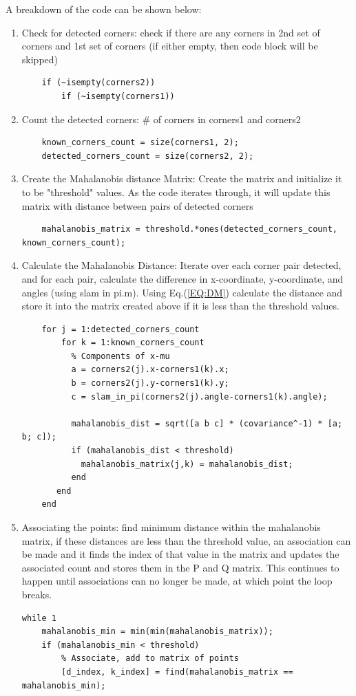 A breakdown of the code can be shown below:
\begin{enumerate}
    \item Check for detected corners: check if there are any corners in 2nd set of corners and 1st set of corners (if either empty, then code block will be skipped)
    \begin{lstlisting}
    if (~isempty(corners2))
        if (~isempty(corners1))
    \end{lstlisting}
    \item Count the detected corners: \# of corners in corners1 and corners2
    \begin{lstlisting}
    known_corners_count = size(corners1, 2);
    detected_corners_count = size(corners2, 2);
    \end{lstlisting}
    \item Create the Mahalanobis distance Matrix: Create the matrix and initialize it to be "threshold" values. As the code iterates through, it will update this matrix with distance between pairs of detected corners
    \begin{lstlisting}
    mahalanobis_matrix = threshold.*ones(detected_corners_count, known_corners_count);
    \end{lstlisting}
    \item Calculate the Mahalanobis Distance: Iterate over each corner pair detected, and for each pair, calculate the difference in x-coordinate, y-coordinate, and angles (using slam in pi.m). Using Eq.(\ref{EQ:DM}) calculate the distance and store it into the matrix created above if it is less than the threshold values.
    \begin{lstlisting}
    for j = 1:detected_corners_count
        for k = 1:known_corners_count
		  % Components of x-mu
		  a = corners2(j).x-corners1(k).x;
		  b = corners2(j).y-corners1(k).y;
		  c = slam_in_pi(corners2(j).angle-corners1(k).angle);

		  mahalanobis_dist = sqrt([a b c] * (covariance^-1) * [a; b; c]);
		  if (mahalanobis_dist < threshold)
            mahalanobis_matrix(j,k) = mahalanobis_dist;
		  end
	   end
    end
    \end{lstlisting}
    \item Associating the points: find minimum distance within the mahalanobis matrix, if these distances are less than the threshold value, an association can be made and it finds the index of that value in the matrix and updates the associated count and stores them in the P and Q matrix. This continues to happen until associations can no longer be made, at which point the loop breaks.
    \begin{lstlisting}
while 1
    mahalanobis_min = min(min(mahalanobis_matrix));
    if (mahalanobis_min < threshold)
		% Associate, add to matrix of points
		[d_index, k_index] = find(mahalanobis_matrix == mahalanobis_min);
					

\end{lstlisting}
\end{enumerate}
